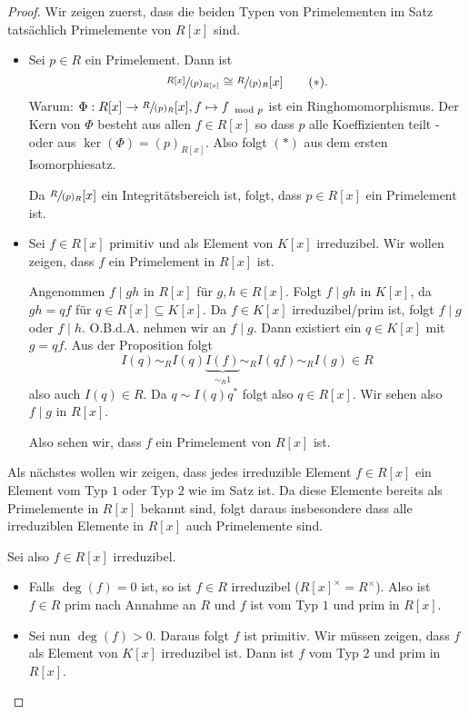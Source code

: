 \begin{proof}
	Wir zeigen zuerst, dass die beiden Typen von Primelementen im Satz tatsächlich Primelemente von $R[x]$ sind.
	\begin{itemize}
		\item Sei $p \in R$ ein Primelement. Dann ist 
			\[
				\sfrac{R[x]}{(p)_{R[x]}} \cong \sfrac{R}{(p)_{R}}[x] \tag{$*$}
			.\]
			Warum: $\Phi: R[x] \to \sfrac{R}{(p)_{R}}[x], f \mapsto f_{\mod p}$ ist ein Ringhomomorphismus.
			Der Kern von $\Phi$ besteht aus allen $f \in R[x]$ so dass $p$ alle Koeffizienten teilt - oder aus $\ker(\Phi) = (p)_{R[x]}$.
			Also folgt $(*)$ aus dem ersten Isomorphiesatz.

			Da $\sfrac{R}{(p)_{R}}[x]$ ein Integritätsbereich ist, folgt, dass $p \in R[x]$ ein Primelement ist.

		\item Sei $f \in R[x]$ primitiv und als Element von $K[x]$ irreduzibel.
			Wir wollen zeigen, dass $f$ ein Primelement in $R[x]$ ist.

			Angenommen $f \mid gh$ in $R[x]$ für $g,h \in R[x]$.
			Folgt $f \mid gh $ in $K[x]$, da $gh = qf$ für $q \in R[x] \subseteq K[x]$.
			Da $f \in K[x]$ irreduzibel/prim ist, folgt $f \mid g$ oder $f \mid h$.
			O.B.d.A. nehmen wir an $f \mid g$. Dann existiert ein $q \in K[x]$ mit $g = q f$.
			Aus der Proposition folgt 
			\[
				I(q) \sim_{R} I(q) \underbrace{I(f)}_{\sim_{R} 1} \sim_{R} I(qf) \sim_{R} I(g) \in R
			\]
			also auch $I(q) \in R$. Da $q \sim I(q) q^{*}$ folgt also $q \in R[x]$.
			Wir sehen also $f \mid g$ in $R[x]$.

			Also sehen wir, dass $f$ ein Primelement von $R[x]$ ist. 
	\end{itemize}
	Als nächstes wollen wir zeigen, dass jedes irreduzible Element $f \in R[x]$ ein Element vom Typ $1$ oder Typ $2$ wie im Satz ist.
	Da diese Elemente bereits als Primelemente in $R[x]$ bekannt sind, folgt daraus insbesondere dass alle irreduziblen Elemente in $R[x]$ auch
	Primelemente sind.

	Sei also $f \in R[x]$ irreduzibel.
	\begin{itemize}
		\item Falls $\deg(f) = 0$ ist, so ist $f \in R$ irreduzibel ($R[x]^{\times} = R^{\times}$).
			Also ist $f \in R$  prim nach Annahme an $R$ und $f$ ist vom Typ $1$ und prim in $R[x]$.
		\item Sei nun $\deg(f) > 0$. Daraus folgt $f$ ist primitiv.
			Wir müssen zeigen, dass $f$ als Element von $K[x]$ irreduzibel ist.
			Dann ist $f$ vom Typ $2$ und prim in $R[x]$.
	\end{itemize}
\end{proof}
































